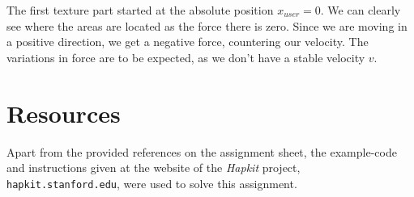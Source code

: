   \begin{figure}[H]
    \centering
  \end{figure}

  The first texture part started at the absolute position $x_{user} = 0$. We can clearly see where the areas are located as the force there is zero. Since we are moving in a positive direction, we get a negative force, countering our velocity. The variations in force are to be expected, as we don't have a stable velocity $v$.

  \section*{Resources}

  Apart from the provided references on the assignment sheet, the example-code and instructions given at the website of the \textit{Hapkit} project,\\ \texttt{hapkit.stanford.edu}, were used to solve this assignment.

